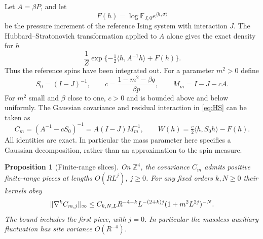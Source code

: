 \documentclass[11pt]{article}
\newtheorem{proposition}{Proposition}[section]
\newcommand{\E}{\mathbb E}
\newcommand{\Z}{\mathbb Z}
\DeclarePairedDelimiter{\norm}{\lVert}{\rVert}
\begin{document}
Let \(A=\beta P\), and let
\[
 F(h)=\log \E_{J,0}e^{\langle h,\sigma\rangle}
\]
be the pressure increment of the reference Ising system with interaction \(J\). The Hubbard--Stratonovich transformation applied to \(A\) alone gives the exact density for \(h\)
\begin{equation}\label{eq:HS}
 \frac1Z\exp\{-\tfrac12\langle h,A^{-1}h\rangle+F(h)\}.
\end{equation}
Thus the reference spins have been integrated out. For a parameter \(m^2>0\) define
\[
 S_0=(I-J)^{-1},\qquad c=\frac{1-m^2-\beta q}{\beta p},\qquad
 M_m=I-J-cA .
\]
For \(m^2\) small and \(\beta\) close to one, \(c>0\) and is bounded above and below uniformly. The Gaussian covariance and residual interaction in \eqref{eq:HS} can be taken as
\begin{equation}\label{eq:preCov}
 C_m=(A^{-1}-cS_0)^{-1}=A(I-J)M_m^{-1},\qquad
 W(h)=\tfrac c2\langle h,S_0h\rangle-F(h).
\end{equation}
All identities are exact. In particular the mass parameter here specifies a Gaussian decomposition, rather than an approximation to the spin measure.

\begin{proposition}[Finite-range slices]\label{prop:frd}
On \(\Z^4\), the covariance \(C_m\) admits positive finite-range pieces at lengths \(O(RL^j)\), \(j\ge0\). For any fixed orders \(k,N\ge0\) their kernels obey
\begin{equation}\label{eq:slicebound}
 \norm{\nabla^k C_{m,j}}_\infty
 \le C_{k,N,L}R^{-4-k}L^{-(2+k)j}(1+m^2 L^{2j})^{-N}.
\end{equation}
The bound includes the first piece, with \(j=0\). In particular the massless auxiliary fluctuation has site variance \(O(R^{-4})\).
\end{proposition}
\end{document}
